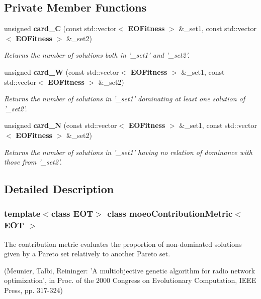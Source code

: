 \subsection*{Private Member Functions}
\begin{CompactItemize}
\item 
unsigned {\bf card\_\-C} (const std::vector$<$ {\bf EOFitness} $>$ \&\_\-set1, const std::vector$<$ {\bf EOFitness} $>$ \&\_\-set2)
\begin{CompactList}\small\item\em Returns the number of solutions both in '\_\-set1' and '\_\-set2'. \item\end{CompactList}\item 
unsigned {\bf card\_\-W} (const std::vector$<$ {\bf EOFitness} $>$ \&\_\-set1, const std::vector$<$ {\bf EOFitness} $>$ \&\_\-set2)
\begin{CompactList}\small\item\em Returns the number of solutions in '\_\-set1' dominating at least one solution of '\_\-set2'. \item\end{CompactList}\item 
unsigned {\bf card\_\-N} (const std::vector$<$ {\bf EOFitness} $>$ \&\_\-set1, const std::vector$<$ {\bf EOFitness} $>$ \&\_\-set2)
\begin{CompactList}\small\item\em Returns the number of solutions in '\_\-set1' having no relation of dominance with those from '\_\-set2'. \item\end{CompactList}\end{CompactItemize}


\subsection{Detailed Description}
\subsubsection*{template$<$class EOT$>$ class moeo\-Contribution\-Metric$<$ EOT $>$}

The contribution metric evaluates the proportion of non-dominated solutions given by a Pareto set relatively to another Pareto set. 

(Meunier, Talbi, Reininger: 'A multiobjective genetic algorithm for radio network optimization', in Proc. of the 2000 Congress on Evolutionary Computation, IEEE Press, pp. 317-324) 



